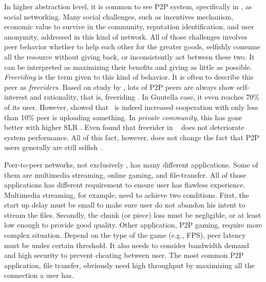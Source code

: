 In higher abstraction level, it is common to see P2P system, specifically in \bt, as social networking. Many social challenges, such as incentives mechanism, economic value to survive in the community, reputation identification, and user anonymity, addressed in this kind of network. All of those challenges involves peer behavior whether to help each other for the greater goods, selfishly consume all the resource without giving back, or inconsistently act between these two. It can be interpreted as maximizing their benefits and giving as little as possible. \textit{Freeriding} is the term given to this kind of behavior. It is often to describe this peer as \textit{freeriders}. Based on study by \citeauthor{2000:freeridegnutella:adar}, lots of P2P peers are always show self-interest and rationality, that is, freeriding \cite{2000:freeridegnutella:adar}. In Gnutella case, it even reaches 70\% of its user.  However, \citeauthor{2005:bittorrentcooperation:andrade} showed that \bt~is indeed increased cooperation with only less than 10\% peer is uploading something. In \textit{private community}, this has gone better with higher SLR \cite{2005:bittorrentcooperation:andrade}. Even \citeauthor{2015:freeriderinbtcommunity:das} found that freerider in \bt~ does not deteriorate system performance\cite{2015:freeriderinbtcommunity:das}. All of this fact, however, does not change the fact that P2P users generally are still selfish \cite{2014:userbehaviourprivate:jia}. 

Peer-to-peer networks, not exclusively \bt, has many different applications. Some of them are multimedia streaming, online gaming, and file-transfer. All of those applications has different requirement to ensure user has flawless experience. Multimedia streaming, for example, need to achieve two conditions. First, the start up delay must be small to make sure user do not abandon his intent to stream the files. Secondly, the chunk (or piece) loss must be negligible, or at least low enough to provide good quality\cite{2008:givetogetvod:Mol}. Other application, P2P gaming, require more complex situation. Depend on the type of the game (e.g., FPS), peer latency must be under certain threshold\cite{2010:surveyp2pgame:shen}. It also needs to consider bandwidth demand and high security to prevent cheating between user. The most common P2P application, file transfer, obviously need high throughput by maximizing all the connection a user has.

